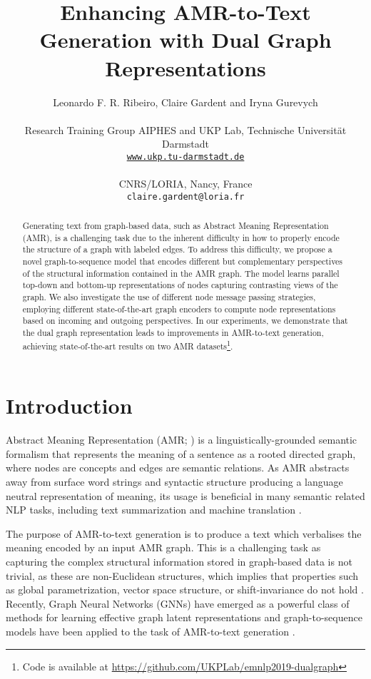 \documentclass[11pt,a4paper]{article}
\title{Enhancing AMR-to-Text Generation with Dual Graph Representations}
\author{Leonardo F. R. Ribeiro, Claire Gardent and Iryna Gurevych \\\\
  Research Training Group AIPHES and UKP Lab, Technische Universit\"at Darmstadt\\
  \texttt{\href{https://www.ukp.tu-darmstadt.de}{www.ukp.tu-darmstadt.de}} \\
  \rule{0pt}{2.5ex}
  CNRS/LORIA, Nancy, France \\
 \texttt{claire.gardent@loria.fr}
}
\date{}
\newcommand\ftnote[1]{\footnote{\raggedright#1}}
\begin{document}
\maketitle
\begin{abstract}
Generating text from graph-based data, such as Abstract Meaning Representation (AMR), is a challenging task due to the inherent difficulty in how to properly encode the structure of a graph with labeled edges. To address this difficulty, we propose a novel \mbox{graph-to-sequence} model that encodes different but complementary perspectives of the structural information contained in the AMR graph. The model learns parallel top-down and bottom-up representations of nodes capturing contrasting views of the graph. We also investigate the use of different node message passing strategies, employing different state-of-the-art graph encoders to compute node representations based on incoming and outgoing perspectives. In our experiments, we demonstrate that the dual graph representation leads to improvements in \mbox{AMR-to-text} generation, achieving state-of-the-art results on two AMR datasets\ftnote{Code is available at \href{https://github.com/UKPLab/emnlp2019-dualgraph}{https://github.com/UKPLab/emnlp2019-dualgraph}}.
\end{abstract}



\section{Introduction}

Abstract Meaning Representation (AMR; \citet{banarescu-etal-2013-abstract}) is a linguistically-grounded semantic formalism that represents the meaning of a sentence as a rooted directed graph, where nodes are concepts and edges are semantic relations. As AMR abstracts away from surface word strings and syntactic structure producing a language neutral representation of meaning, its usage is beneficial in many semantic related NLP tasks, including text summarization \cite{liao-etal-2018-abstract} and machine translation \cite{song-etal-2019-semantic}.

The purpose of \mbox{AMR-to-text} generation is to produce a text which verbalises the meaning encoded by an input AMR graph. This is a challenging task as capturing the complex structural information stored in graph-based data is not trivial, as these are non-Euclidean structures, which implies that properties such as global parametrization, vector space structure, or shift-invariance do not hold \cite{geometric_deeplearning}. Recently, Graph Neural Networks (GNNs) have emerged as a powerful class of methods for learning effective graph latent representations \cite{xu2018how} and \mbox{graph-to-sequence} models have been applied to the task of \mbox{AMR-to-text} generation \cite{song-etal-acl2018,beck-etal-2018-acl2018,damonte_naacl18, dcgcnforgraph2seq19guo}.
\end{document}
